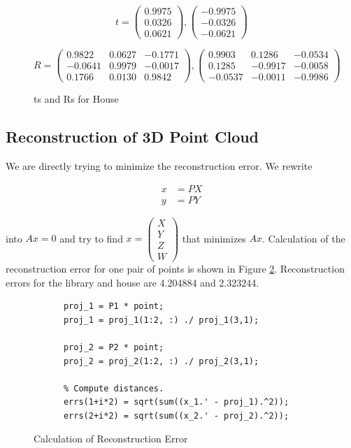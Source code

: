 \documentclass[11pt]{article}
\begin{document}
\begin{figure}[h!]
  \caption{ts and Rs for House}
  \label{tr_house}
  \centering
    \[t = \begin{pmatrix}
      0.9975\\
      0.0326\\
      0.0621
    \end{pmatrix}, 
    \begin{pmatrix}
      -0.9975\\
      -0.0326\\
      -0.0621
    \end{pmatrix}\]

    \[R = \begin{pmatrix}
      0.9822&0.0627&-0.1771\\
     -0.0641&0.9979&-0.0017\\
      0.1766&0.0130&0.9842
    \end{pmatrix},
    \begin{pmatrix}
      0.9903&0.1286&-0.0534\\
      0.1285&-0.9917&-0.0058\\
      -0.0537&-0.0011&-0.9986
    \end{pmatrix}\]
\end{figure}


\subsection{Reconstruction of 3D Point Cloud}
We are directly trying to minimize the reconstruction error. We rewrite

\begin{align*}
  x &= PX\\
  y &= PY
\end{align*}

into $Ax = 0$ and try to find $x = \begin{pmatrix}X\\Y\\Z\\W\end{pmatrix}$
that minimizes $Ax$. Calculation of the reconstruction error for one pair of
points is shown in Figure \ref{reconstruction_code}. Reconstruction errors for
the library and house are 4.204884 and 2.323244.

\begin{figure}[h!]
  \caption{Calculation of Reconstruction Error}
  \label{reconstruction_code}
  \centering
    \begin{lstlisting}
      proj_1 = P1 * point;
      proj_1 = proj_1(1:2, :) ./ proj_1(3,1);

      proj_2 = P2 * point;
      proj_2 = proj_2(1:2, :) ./ proj_2(3,1);

      % Compute distances.
      errs(1+i*2) = sqrt(sum((x_1.' - proj_1).^2));
      errs(2+i*2) = sqrt(sum((x_2.' - proj_2).^2));
    \end{lstlisting}
\end{figure}
\end{document}
